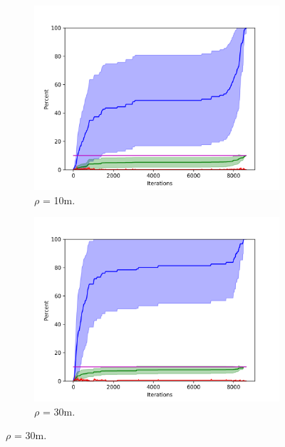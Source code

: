 \begin{figure}

\begin{subfigure}{0.5\textwidth}
\includegraphics[width=\linewidth]{images/plots/Network_rA_10.0/new_plots/10_10.png}
\caption{$\rho$ = 10m.} 
\label{fig:random10}
\end{subfigure}
\hspace*{\fill} %
\begin{subfigure}{0.5\textwidth}
\includegraphics[width=\linewidth]{images/plots/Network_rA_10.0/new_plots/30_10.png}
\caption{$\rho$ = 30m.} 
\label{fig:random30}
\end{subfigure}


\end{figure}
